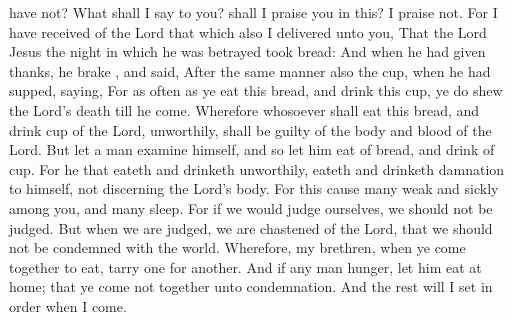 {have
not?
What shall I
say to
you? shall I
praise
you
in
this? I
praise
{}
not.
For
I have
received
of the
Lord that
which
also I
delivered unto
you,
That the
Lord
Jesus the
{}
night
in
which he was
betrayed
took
bread:
And when he had given
thanks, he
brake
{},
and
said,
{}
After the same
manner
also
{} the
cup,
when he had
supped,
saying,
{}
For as often
as ye
eat
this
bread,
and
drink
this
cup, ye do
shew the
Lord’s
death
till he
come.
Wherefore
whosoever shall
eat
this
bread,
and
drink
{}
cup of the
Lord,
unworthily, shall
be guilty
of the
body
and
blood of the
Lord.
But
let a
man
examine
himself,
and
so let him
eat
of
{}
bread,
and
drink
of
{}
cup.
For
he that
eateth
and
drinketh
unworthily,
eateth
and
drinketh
damnation to
himself,
not
discerning the
Lord’s
body.
For this
cause
many
{}
weak
and
sickly
among
you,
and
many
sleep.
For
if we would
judge
ourselves, we
should
not be
judged.
But when we are
judged, we are
chastened
of the
Lord,
that we
should
not be
condemned
with the
world.
Wherefore,
my
brethren, when ye come
together
to
eat, tarry
one for
another.
And
if any
man
hunger, let him
eat
at
home;
that ye
come
not
together
unto
condemnation.
And the
rest will I set in
order
when I
come.

}
